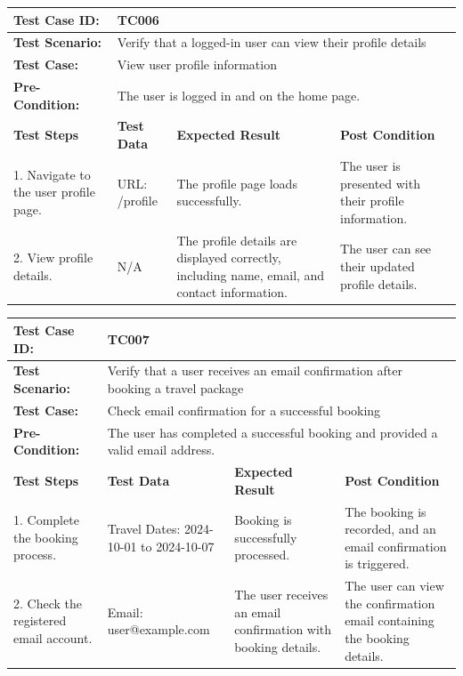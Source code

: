 \documentclass{scrreprt}
\begin{document}
\begin{longtable}{| m{2cm} | m{5cm} | m{4cm} | m{3cm} |}
\hline

\textbf{Test Case ID:} & \multicolumn{3}{l|}{TC006} \\ \hline
\textbf{Test Scenario:} & \multicolumn{3}{l|}{Verify that a logged-in user can view their profile details} \\ \hline
\textbf{Test Case:} & \multicolumn{3}{l|}{View user profile information} \\ \hline
\textbf{Pre-Condition:} & \multicolumn{3}{l|}{The user is logged in and on the home page.} \\ \hline
\textbf{Test Steps} & \textbf{Test Data} & \textbf{Expected Result} & \textbf{Post Condition} \\ \hline
1. Navigate to the user profile page. & URL: /profile & The profile page loads successfully. & The user is presented with their profile information. \\ \hline
2. View profile details. & N/A & The profile details are displayed correctly, including name, email, and contact information. & The user can see their updated profile details. \\ \hline
\end{longtable}

\vspace{1cm}

\begin{longtable}{| m{2cm} | m{5cm} | m{4cm} | m{3cm} |}
\hline

\textbf{Test Case ID:} & \multicolumn{3}{l|}{TC007} \\ \hline
\textbf{Test Scenario:} & \multicolumn{3}{l|}{Verify that a user receives an email confirmation after booking a travel package} \\ \hline
\textbf{Test Case:} & \multicolumn{3}{l|}{Check email confirmation for a successful booking} \\ \hline
\textbf{Pre-Condition:} & \multicolumn{3}{l|}{The user has completed a successful booking and provided a valid email address.} \\ \hline
\textbf{Test Steps} & \textbf{Test Data} & \textbf{Expected Result} & \textbf{Post Condition} \\ \hline
1. Complete the booking process. & Travel Dates: 2024-10-01 to 2024-10-07 & Booking is successfully processed. & The booking is recorded, and an email confirmation is triggered. \\ \hline
2. Check the registered email account. & Email: user@example.com & The user receives an email confirmation with booking details. & The user can view the confirmation email containing the booking details. \\ \hline
\end{longtable}
\end{document}
